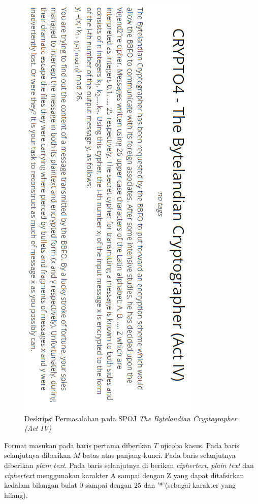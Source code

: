 	\begin{figure}[H]
		\centering
		\includegraphics[scale=0.8]{images/bab2/crypto_def.png}
		\caption{Deskripsi Permasalahan pada SPOJ \textit{The Bytelandian Cryptographer (Act IV)}}
		\label{fig:crypto4_def}
	\end{figure}
	
	Format masukan pada baris pertama diberikan $T$ ujicoba kasus. Pada baris selanjutnya diberikan $M$ batas atas panjang kunci. Pada baris selanjutnya diberikan \textit{plain text}. Pada baris selanjutnya di berikan \textit{ciphertext}, \textit{plain text} dan \textit{ciphertext} menggunakan karakter A sampai dengan Z yang dapat ditafsirkan kedalam bilangan bulat 0 sampai dengan 25 dan '*'(sebagai karakter yang hilang).
	
